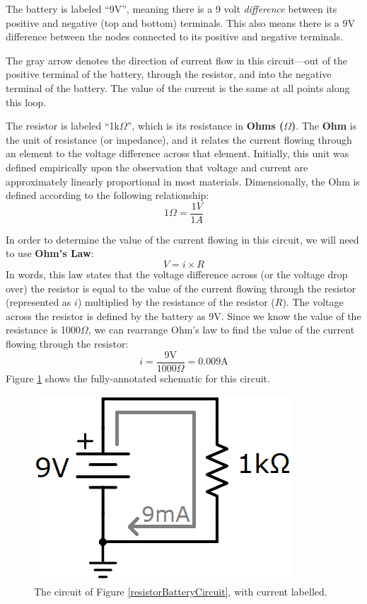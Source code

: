 The battery is labeled ``9V'', meaning there is a 9 volt \textit{difference} between its positive and negative (top and bottom) terminals. This also means there is a 9V difference between the nodes connected to its positive and negative terminals. 
\par
The gray arrow denotes the direction of current flow in this circuit---out of the positive terminal of the battery, through the resistor, and into the negative terminal of the battery. The value of the current is the same at all points along this loop.
\par
The resistor is labeled ``1k$\Omega$'', which is its resistance in \textbf{Ohms ($\Omega$)}. The \textbf{Ohm} is the unit of resistance (or impedance), and it relates the current flowing through an element to the voltage difference across that element. Initially, this unit was defined empirically upon the observation that voltage and current are approximately linearly proportional in most materials. Dimensionally, the Ohm is defined according to the following relationship:
$$
1\Omega = \frac{1V}{1A}
$$
\par
In order to determine the value of the current flowing in this circuit, we will need to use \textbf{Ohm's Law}:
$$
V=i \times R
$$
In words, this law states that the voltage difference across (or the voltage drop over) the resistor is equal to the value of the current flowing through the resistor (represented as $i$) multiplied by the resistance of the resistor ($R$). The voltage across the resistor is defined by the battery as 9V. Since we know the value of the resistance is 1000$\Omega$, we can rearrange Ohm's law to find the value of the current flowing through the resistor:
$$
i = \frac{9\textrm{V}}{1000\Omega} = 0.009 \textrm{A}
$$
Figure \ref{resistorBatteryCurrentCircuit} shows the fully-annotated schematic for this circuit.
\begin{figure}[h!]
\centering
\includegraphics{figures/batteryResistorCurrentCircuit.png}
\caption{The circuit of Figure \ref{resistorBatteryCircuit}, with current labelled.}
\label{resistorBatteryCurrentCircuit}
\end{figure}
